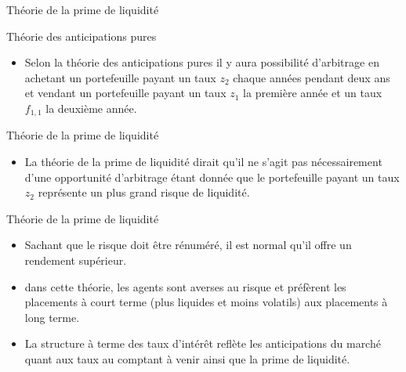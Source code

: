 \documentclass[11pt]{beamer}
\begin{document}
\begin{frame}{Théorie de la prime de liquidité}
\begin{block}{Théorie des anticipations pures}
\begin{itemize}
\item Selon la théorie des anticipations pures  il y aura possibilité d'arbitrage en achetant un portefeuille payant un taux $z_2$ chaque années pendant deux ans et vendant un portefeuille payant un taux $z_1$ la première année et un taux $f_{1,1}$ la deuxième année. 
\end{itemize}
\end{block}
\begin{block}{Théorie de la prime de liquidité}
\begin{itemize}
\item La théorie de la prime de liquidité dirait qu'il ne s'agit pas nécessairement d'une opportunité d'arbitrage étant donnée que le portefeuille payant un taux $z_2$ représente un plus grand risque de liquidité. 
\end{itemize}
\end{block}
\end{frame}

\begin{frame}{Théorie de la prime de liquidité}
\begin{itemize}
\item Sachant que le risque doit être rénuméré,  il est normal qu'il offre un rendement supérieur.  
\item dans cette théorie,  les agents sont averses au risque et préfèrent les placements à court terme (plus liquides et moins volatils) aux placements à long terme. 
\item La structure à terme des taux d’intérêt reflète les anticipations du marché quant aux taux au comptant à venir ainsi que la prime de liquidité.
\end{itemize}
\end{frame}
\end{document}
